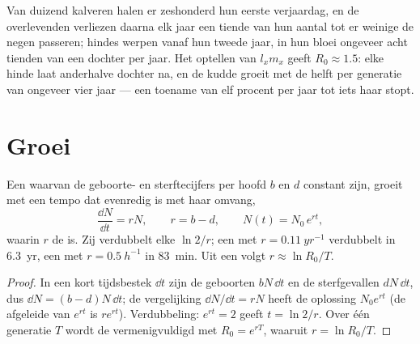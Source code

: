 \begin{example}\label{ex:b1:populations:deer}
Van duizend kalveren halen er zeshonderd hun eerste verjaardag, en de
overlevenden verliezen daarna elk jaar een tiende van hun aantal tot er
weinige de negen passeren; hindes werpen vanaf hun tweede jaar, in hun
bloei ongeveer acht tienden van een dochter per jaar. Het optellen van
$l_x m_x$ geeft $R_0 \approx 1.5$: elke hinde laat anderhalve dochter na,
en de kudde groeit met de helft per generatie van ongeveer vier jaar ---
een toename van elf procent per jaar tot iets haar stopt.
\end{example}

\section{Groei}

\begin{theorem}\label{thm:b1:populations:exponential}
Een  waarvan de geboorte- en sterftecijfers per hoofd $b$ en $d$
constant zijn, groeit met een tempo dat evenredig is met haar omvang,
\[
\frac{\dd N}{\dd t} = rN, \qquad r = b - d, \qquad N(t) = N_0\,e^{rt},
\]
waarin $r$ de \emph{} is. Zij verdubbelt elke
$\ln 2/r$; een  met $r = \qty{0.11}{yr^{-1}}$ verdubbelt in
\qty{6.3}{yr}, een met $r = \qty{0.5}{h^{-1}}$ in \qty{83}{min}. Uit een
 volgt $r \approx \ln R_0 / T$.
\end{theorem}
\begin{proof}
In een kort tijdsbestek $\dd t$ zijn de geboorten $bN\,\dd t$ en de
sterfgevallen $dN\,\dd t$, dus $\dd N = (b - d)N\,\dd t$; de vergelijking
$\dd N/\dd t = rN$ heeft de oplossing $N_0 e^{rt}$ (de afgeleide van
$e^{rt}$ is $re^{rt}$). Verdubbeling: $e^{rt} = 2$ geeft $t = \ln 2/r$. Over
één generatie $T$ wordt de  vermenigvuldigd met $R_0 = e^{rT}$,
waaruit $r = \ln R_0/T$.
\end{proof}

